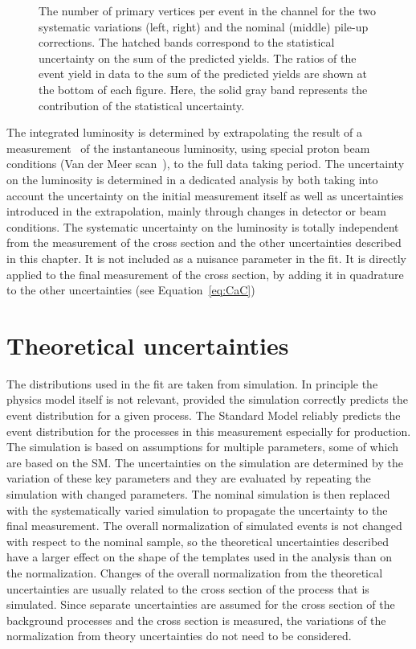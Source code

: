 \begin{figure}[htbp!]
\begin{center}
\caption{The number of primary vertices per event in the \emu channel for the two systematic variations (left, right) and the nominal (middle) pile-up corrections.
The hatched bands correspond to the statistical uncertainty on the sum of the predicted yields. 
        The ratios of the event yield in data to the sum of the predicted yields are
        shown at the bottom of each figure. Here, the solid gray band
        represents the contribution of the statistical uncertainty.
  \label{fig:control_var_PU}}
  \end{center}
\end{figure}


The integrated luminosity is determined by extrapolating the result of a measurement~\cite{CMS-PAS-LUM-17-001} of the instantaneous luminosity, using special proton beam conditions (Van der Meer scan~\cite{Zanetti:1357856}), to the full data taking period.
The uncertainty on the luminosity is determined in a dedicated analysis by both taking into account the uncertainty on the initial measurement itself as well as uncertainties
introduced in the extrapolation, mainly through changes in detector or beam conditions.
The systematic uncertainty on the luminosity is totally independent from the measurement of the \ttbar cross section and the other uncertainties described in this chapter.
It is not included as a nuisance parameter in the fit. It is directly applied to the final measurement of the \ttbar cross section, by adding it in quadrature to the other uncertainties (see Equation~\ref{eq:CaC})

\section{Theoretical uncertainties}
\label{sec:theo_uncert}

The distributions used in the fit are taken from simulation. In principle the physics model itself is not relevant, provided the simulation correctly predicts the event distribution for a given process.
The Standard Model reliably predicts the event distribution for the processes in this measurement especially for \ttbar production.
The simulation is based on assumptions for multiple parameters, some of which are based on the SM. The uncertainties on the simulation are determined by the variation of these key parameters and they are
evaluated by repeating the simulation with changed parameters. The nominal simulation is then replaced with the systematically varied simulation to propagate the uncertainty to the final measurement.
The overall normalization of simulated \ttbar events is not changed with respect to the nominal sample, so the theoretical uncertainties described have a larger effect on the shape of the templates used
in the analysis than on the normalization. Changes of the overall normalization from the theoretical uncertainties are usually related to the cross section of the process that is simulated. Since separate uncertainties are
assumed for the cross section of the background processes and the \ttbar cross section is measured, the variations of the normalization from theory uncertainties do not need to be considered.

